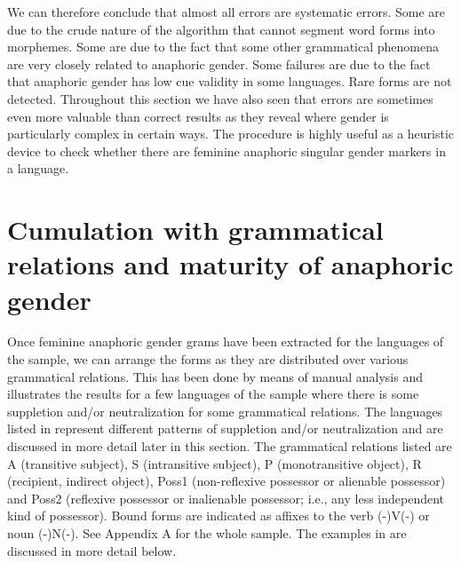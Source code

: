 \documentclass[output=collectionpaper]{langsci/langscibook}
\begin{document}
We can therefore conclude that almost all errors are systematic errors. Some are due to the crude nature of the algorithm that cannot segment word forms into morphemes. Some are due to the fact that some other grammatical phenomena are very closely related to anaphoric gender. Some failures are due to the fact that anaphoric gender has low cue validity in some languages. Rare forms are not detected. Throughout this section we have also seen that errors are sometimes even more valuable than correct results as they reveal where gender is particularly complex in certain ways. The procedure is highly useful as a heuristic device to check whether there are feminine anaphoric singular gender markers in a language.

\section{Cumulation with grammatical relations and maturity of anaphoric gender}
\label{sec:BW:4}

Once feminine anaphoric gender grams have been extracted for the languages of the sample, we can arrange the forms as they are distributed over various grammatical relations. This has been done by means of manual analysis and  illustrates the results for a few languages of the sample where there is some suppletion and/or neutralization for some grammatical relations. The languages listed in  represent different patterns of suppletion and/or neutralization and are discussed in more detail later in this section. The grammatical relations listed are A (transitive subject), S (intransitive subject), P (monotransitive object), R (recipient, indirect object), Poss1 (non-reflexive possessor or alienable possessor) and Poss2 (reflexive possessor or inalienable possessor; i.e., any less independent kind of possessor). Bound forms are indicated as affixes to the verb (-)V(-) or noun (-)N(-). See Appendix A for the whole sample. The examples in  are discussed in more detail below.
\end{document}
